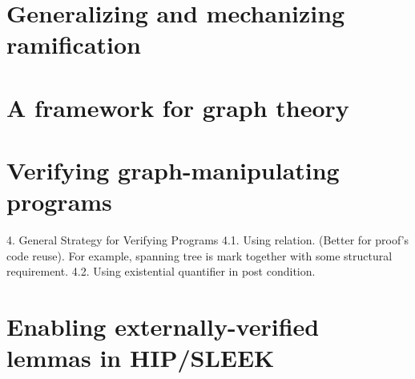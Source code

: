 \documentclass[pldi]{sigplanconf-pldi15}
\begin{document}
\section{Generalizing and mechanizing ramification}
\label{sec:example}



\section{A framework for graph theory}




\section{Verifying graph-manipulating programs}

4. General Strategy for Verifying Programs
4.1. Using relation. (Better for proof's code reuse). For example, spanning tree is mark together with some structural requirement.
4.2. Using existential quantifier in post condition.




\section{Enabling externally-verified lemmas in HIP/SLEEK}
\end{document}
